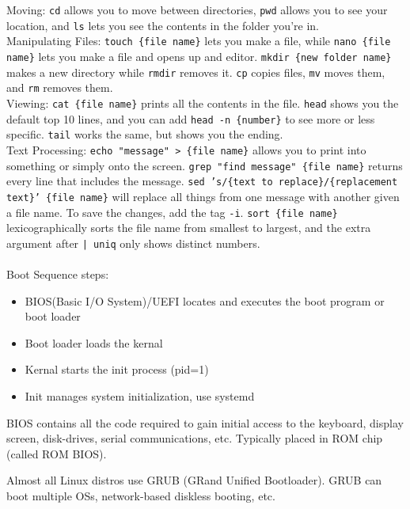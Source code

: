 \documentclass[11pt]{article}
\begin{document}
\noindent Moving: \texttt{cd} allows you to move between directories, \texttt{pwd} allows you to see your location, and \texttt{ls} lets you see the contents in the folder you're in. \\

\noindent Manipulating Files: \texttt{touch \{file name\}} lets you make a file, while \texttt{nano \{file name\}} lets you make a file and opens up and editor. \texttt{mkdir \{new folder name\}} makes a new directory while \texttt{rmdir} removes it. \texttt{cp} copies files, \texttt{mv} moves them, and \texttt{rm} removes them. \\

\noindent Viewing: \texttt{cat \{file name\}} prints all the contents in the file. \texttt{head} shows you the default top 10 lines, and you can add \texttt{head -n \{number\}} to see more or less specific. \texttt{tail} works the same, but shows you the ending. \\

\noindent Text Processing: \texttt{echo "message" > \{file name\}} allows you to print into something or simply onto the screen. \texttt{grep "find message" \{file name\}} returns every line that includes the message. \texttt{sed 's/\{text to replace\}/\{replacement text\}' \{file name\}} will replace all things from one message with another given a file name. To save the changes, add the tag \texttt{-i}. \texttt{sort \{file name\}} lexicographically sorts the file name from smallest to largest, and the extra argument after \texttt{| uniq} only shows distinct numbers. \\ \\

\noindent Boot Sequence steps:
\begin{itemize}
    \item BIOS(Basic I/O System)/UEFI locates and executes the boot program or boot loader
    \item Boot loader loads the kernal
    \item Kernal starts the init process (pid=1)
    \item Init manages system initialization, use systemd
\end{itemize}

\noindent BIOS contains all the code required to gain initial access to the keyboard, display screen, disk-drives, serial communications, etc. Typically placed in ROM chip (called ROM BIOS). 

\noindent Almost all Linux distros use GRUB (GRand Unified Bootloader). GRUB can boot multiple OSs, network-based diskless booting, etc.
\end{document}
